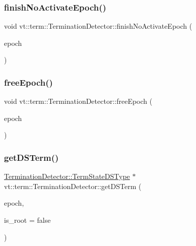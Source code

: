 \subsubsection{\texorpdfstring{finish\+No\+Activate\+Epoch()}{finishNoActivateEpoch()}}
{\footnotesize\ttfamily void vt\+::term\+::\+Termination\+Detector\+::finish\+No\+Activate\+Epoch (\begin{DoxyParamCaption}\item[{\hyperlink{namespacevt_a985a5adf291c34a3ca263b3378388236}{Epoch\+Type} const \&}]{epoch }\end{DoxyParamCaption})}

\mbox{\label{structvt_1_1term_1_1_termination_detector_a3b1e4a0d87c5af08fc36925ec74504fd}} 
\subsubsection{\texorpdfstring{free\+Epoch()}{freeEpoch()}}
{\footnotesize\ttfamily void vt\+::term\+::\+Termination\+Detector\+::free\+Epoch (\begin{DoxyParamCaption}\item[{\hyperlink{namespacevt_a985a5adf291c34a3ca263b3378388236}{Epoch\+Type} const \&}]{epoch }\end{DoxyParamCaption})}

\mbox{\label{structvt_1_1term_1_1_termination_detector_a546a48949da827a98dea2cfaffeddb91}} 
\subsubsection{\texorpdfstring{get\+D\+S\+Term()}{getDSTerm()}}
{\footnotesize\ttfamily \hyperlink{structvt_1_1term_1_1_termination_detector_aa96c37b5c120063060c6418c48e64bd1}{Termination\+Detector\+::\+Term\+State\+D\+S\+Type} $\ast$ vt\+::term\+::\+Termination\+Detector\+::get\+D\+S\+Term (\begin{DoxyParamCaption}\item[{\hyperlink{namespacevt_a985a5adf291c34a3ca263b3378388236}{Epoch\+Type}}]{epoch,  }\item[{bool}]{is\+\_\+root = {\ttfamily false} }\end{DoxyParamCaption})}

